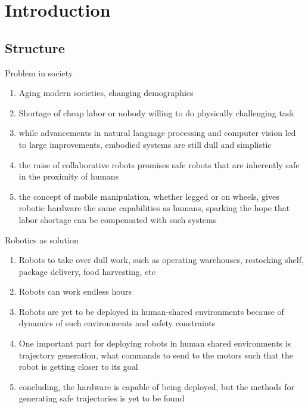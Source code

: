 \chapter{Introduction} %
\label{cha:Introduction}


\iffalse
\section{Structure}

Problem in society
\begin{enumerate}
  \item Aging modern societies, changing demographics
  \item Shortage of cheap labor or nobody willing to do physically challenging
  task
  \item while advancements in natural language processing and computer vision
  led to large improvements, embodied systems are still dull and simplistic
  \item the raise of collaborative robots promises safe robots that are
  inherently safe in the proximity of humans
  \item the concept of mobile manipulation, whether legged or on wheels, gives
  robotic hardware the same capabilities as humans, sparking the hope that
  labor shortage can be compensated with such systems
\end{enumerate}
Robotics as solution
\begin{enumerate}
  \item Robots to take over dull work, such as operating warehouses, restocking
  shelf, package delivery, food harvesting, etc
  \item Robots can work endless hours
  \item Robots are yet to be deployed in human-shared environments because of
  dynamics of such environments and safety constraints
  \item One important part for deploying robots in human shared environments is
  trajectory generation, what commands to send to the motors such that the robot
  is getting closer to its goal
  \item concluding, the hardware is capable of being deployed, but the methods
  for generating safe trajectories is yet to be found
\end{enumerate}
